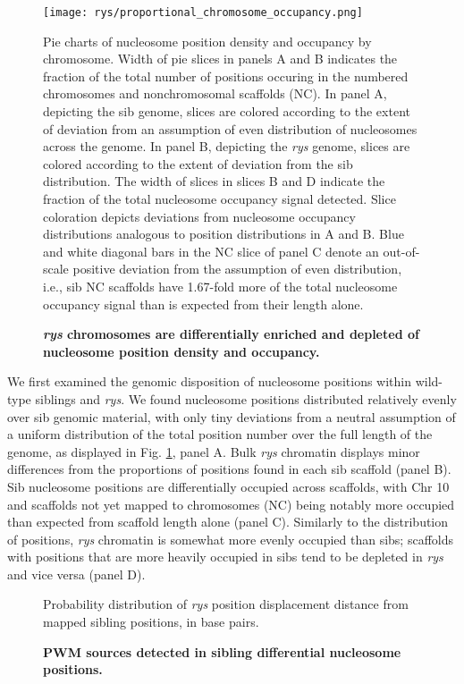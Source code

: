  \begin{figure}[!h]
    \texttt{[image: rys/proportional\_chromosome\_occupancy.png]}
    \caption{{\bf \textit{rys} chromosomes are differentially enriched and depleted of nucleosome position density and occupancy.}}
    Pie charts of nucleosome position density and occupancy by chromosome. Width of pie slices in panels A and B indicates the fraction of the total number of positions occuring in the numbered chromosomes and nonchromosomal scaffolds (NC). In panel A, depicting the sib genome, slices are colored according to the extent of deviation from an assumption of even distribution of nucleosomes across the genome. In panel B, depicting the \textit{rys} genome, slices are colored according to the extent of deviation from the sib distribution. The width of slices in slices B and D indicate the fraction of the total nucleosome occupancy signal detected. Slice coloration depicts deviations from nucleosome occupancy distributions analogous to position distributions in A and B. Blue and white diagonal bars in the NC slice of panel C denote an out-of-scale positive deviation from the assumption of even distribution, i.e., sib NC scaffolds have 1.67-fold more of the total nucleosome occupancy signal than is expected from their length alone.  
    \label{nucgendist}
    \end{figure}
    
 We first examined the genomic disposition of nucleosome positions within wild-type siblings and \textit{rys}. We found nucleosome positions distributed relatively evenly over sib genomic material, with only tiny deviations from a neutral assumption of a uniform distribution of the total position number over the full length of the genome, as displayed in Fig. \ref{nucgendist}, panel A. Bulk \textit{rys} chromatin displays minor differences from the proportions of positions found in each sib scaffold (panel B). Sib nucleosome positions are differentially occupied across scaffolds, with Chr 10 and scaffolds not yet mapped to chromosomes (NC) being notably more occupied than expected from scaffold length alone (panel C). Similarly to the distribution of positions, \textit{rys} chromatin is somewhat more evenly occupied than sibs; scaffolds with positions that are more heavily occupied in sibs tend to be depleted in \textit{rys} and vice versa (panel D). 


\begin{figure}[!h]
    \caption{{\bf PWM sources detected in sibling differential nucleosome positions.}}
    Probability distribution of \textit{rys} position displacement distance from mapped sibling positions, in base pairs. 
    \label{shiftdist}
\end{figure}

